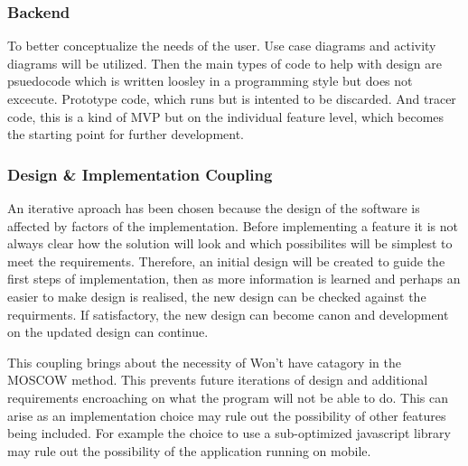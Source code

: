     \subsubsection{Backend}
      To better conceptualize the needs of the user. Use case diagrams and activity diagrams will be utilized. Then the main types of code to help with design are psuedocode which is written loosley in a programming style but does not excecute. Prototype code, which runs but is intented to be discarded. And tracer code, this is a kind of MVP but on the individual feature level, which becomes the starting point for further development.
    \subsubsection{Design \& Implementation Coupling}
      An iterative aproach has been chosen because the design of the software is affected by factors of the implementation. Before implementing a feature it is not always clear how the solution will look and which possibilites will be simplest to meet the requirements. Therefore, an initial design will be created to guide the first steps of implementation, then as more information is learned and perhaps an easier to make design is realised, the new design can be checked against the requirments. If satisfactory, the new design can become canon and development on the updated design can continue.
      \par
      This coupling brings about the necessity of Won't have catagory in the MOSCOW method. This prevents future iterations of design and additional requirements encroaching on what the program will not be able to do. This can arise as an implementation choice may rule out the possibility of other features being included. For example the choice to use a sub-optimized javascript library may rule out the possibility of the application running on mobile.

